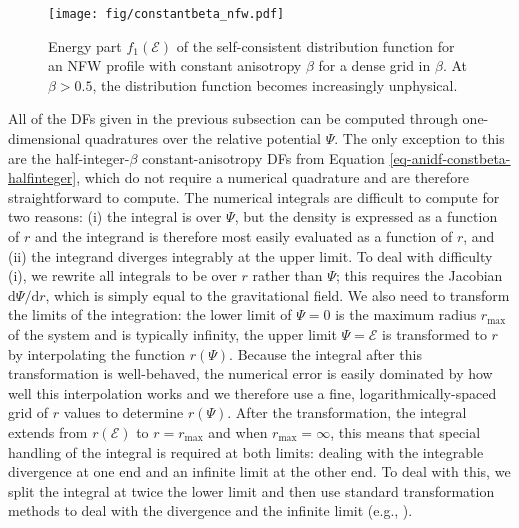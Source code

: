 \begin{figure}
	\centering
	\texttt{[image: fig/constantbeta\_nfw.pdf]}
	\caption{Energy part $f_1(\mathcal{E})$ of the self-consistent distribution function for an NFW profile with constant anisotropy $\beta$ for a dense grid in $\beta$. At $\beta > 0.5$, the distribution function becomes increasingly unphysical.}
	\label{fig:constantbeta_nfw}
\end{figure}

All of the DFs given in the previous subsection can be computed through one-dimensional quadratures over the relative potential $\Psi$. The only exception to this are the half-integer-$\beta$ constant-anisotropy DFs from Equation \eqref{eq-anidf-constbeta-halfinteger}, which do not require a numerical quadrature and are therefore straightforward to compute. The numerical integrals are difficult to compute for two reasons: (i) the integral is over $\Psi$, but the density is expressed as a function of $r$ and the integrand is therefore most easily evaluated as a function of $r$, and (ii) the integrand diverges integrably at the upper limit. To deal with difficulty (i), we rewrite all integrals to be over $r$ rather than $\Psi$; this requires the Jacobian $\mathrm{d} \Psi / \mathrm{d} r$, which is simply equal to the gravitational field. We also need to transform the limits of the integration: the lower limit of $\Psi = 0$ is the maximum radius $r_{\mathrm{max}}$ of the system and is typically infinity, the upper limit $\Psi = \mathcal{E}$ is transformed to $r$ by interpolating the function $r(\Psi)$. Because the integral after this transformation is well-behaved, the numerical error is easily dominated by how well this interpolation works and we therefore use a fine, logarithmically-spaced grid of $r$ values to determine $r(\Psi)$. After the transformation, the integral extends from $r(\mathcal{E})$ to $r=r_{\mathrm{max}}$ and when $r_{\mathrm{max}}=\infty$, this means that special handling of the integral is required at both limits: dealing with the integrable divergence at one end and an infinite limit at the other end. To deal with this, we split the integral at twice the lower limit and then use standard transformation methods to deal with the divergence and the infinite limit (e.g., \citealt{Press07a}). 

